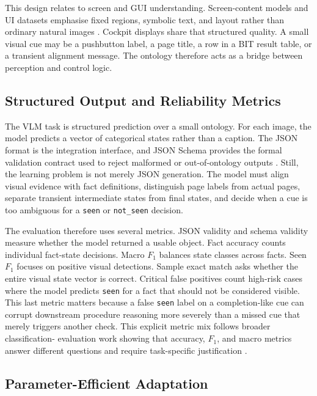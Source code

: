 This design relates to screen and GUI understanding. Screen-content models and
UI datasets emphasise fixed regions, symbolic text, and layout rather than
ordinary natural images \citep{deka2017rico,wang2021screen2words}. Cockpit
displays share that structured quality. A small visual cue may be a pushbutton
label, a page title, a row in a BIT result table, or a transient alignment
message. The ontology therefore acts as a bridge between perception and
control logic.

\subsection{Structured Output and Reliability Metrics}\label{sec:bg-metrics}

The VLM task is structured prediction over a small ontology. For each image,
the model predicts a vector of categorical states rather than a caption. The
JSON format is the integration interface, and JSON Schema provides the formal
validation contract used to reject malformed or out-of-ontology outputs
\citep{pezoa2016jsonschema}. Still, the learning problem is not merely JSON
generation. The model must align visual evidence with fact
definitions, distinguish page labels from actual pages, separate transient
intermediate states from final states, and decide when a cue is too ambiguous
for a \texttt{seen} or \texttt{not\_seen} decision.

The evaluation therefore uses several metrics. JSON validity and schema
validity measure whether the model returned a usable object. Fact accuracy
counts individual fact-state decisions. Macro \(F_1\) balances state classes
across facts. Seen \(F_1\) focuses on positive visual detections. Sample exact
match asks whether the entire visual state vector is correct. Critical false
positives count high-risk cases where the model predicts \texttt{seen} for a
fact that should not be considered visible. This last metric matters because a
false \texttt{seen} label on a completion-like cue can corrupt downstream
procedure reasoning more severely than a missed cue that merely triggers
another check. This explicit metric mix follows broader classification-
evaluation work showing that accuracy, \(F_1\), and macro metrics answer
different questions and require task-specific justification
\citep{powers2011evaluation,opitz2024metrics}.

\subsection{Parameter-Efficient Adaptation}\label{sec:bg-lora}

